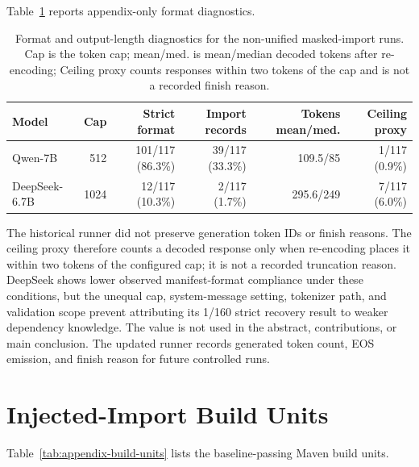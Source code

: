 \documentclass[pdflatex,sn-basic]{sn-jnl}
\begin{document}
Table~\ref{tab:appendix-format} reports appendix-only format diagnostics.

\begin{table}[htbp]
\centering
\caption{Format and output-length diagnostics for the non-unified masked-import runs. Cap is the token cap; mean/med. is mean/median decoded tokens after re-encoding; Ceiling proxy counts responses within two tokens of the cap and is not a recorded finish reason.}
\label{tab:appendix-format}
{\footnotesize
\setlength{\tabcolsep}{3pt}
\begin{tabular}{@{}lrrrrr@{}}
\toprule
Model & Cap & Strict format & Import records & Tokens mean/med. & Ceiling proxy \\
\midrule
Qwen-7B & 512 & 101/117 (86.3\%) & 39/117 (33.3\%) & 109.5/85 & 1/117 (0.9\%) \\
DeepSeek-6.7B & 1024 & 12/117 (10.3\%) & 2/117 (1.7\%) & 295.6/249 & 7/117 (6.0\%) \\
\bottomrule
\end{tabular}
}
\end{table}

The historical runner did not preserve generation token IDs or finish reasons. The ceiling proxy therefore counts a decoded response only when re-encoding places it within two tokens of the configured cap; it is not a recorded truncation reason. DeepSeek shows lower observed manifest-format compliance under these conditions, but the unequal cap, system-message setting, tokenizer path, and validation scope prevent attributing its 1/160 strict recovery result to weaker dependency knowledge. The value is not used in the abstract, contributions, or main conclusion. The updated runner records generated token count, EOS emission, and finish reason for future controlled runs.

\section{Injected-Import Build Units}
\label{app:build-units}

Table~\ref{tab:appendix-build-units} lists the baseline-passing Maven build units.
\end{document}
